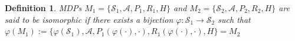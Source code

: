 \documentclass[twoside]{article}
\newtheorem{definition}{Definition}
\newtheorem{assumption}{Assumption}
\newcommand{\N}{\mathbb{N}}
\newcommand{\CAL}[1]{\mathcal{#1}}
\begin{document}

\begin{definition}
MDPs $M_1 = \{\CAL{S}_1, \CAL{A}, P_1, R_1, H\}$ and $M_2 = \{\CAL{S}_2, \CAL{A}, P_2, R_2, H\}$ are said to be isomorphic if there exists a bijection $\varphi: \CAL{S}_1 \to \CAL{S}_2$ such that
$
\varphi(M_1) := \{\varphi(\CAL{S}_1), \CAL{A},P_1(\varphi(\cdot), \cdot), R_1(\varphi(\cdot), \cdot), H\} = M_2
$
\end{definition}
\end{document}
